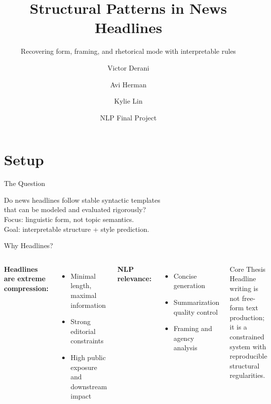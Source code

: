 \documentclass[aspectratio=169, 11pt]{beamer}
\title{Structural Patterns in News Headlines}
\subtitle{Recovering form, framing, and rhetorical mode with interpretable rules}
\author{Victor Derani \and Avi Herman \and Kylie Lin}
\date{NLP Final Project}
\institute{Department of Computer Science}
\begin{document}
\begin{frame}[plain]
  \maketitle
\end{frame}

\section{Setup}

\begin{frame}{The Question}
  \begin{center}
    \Large
    \textcolor{accent}{Do news headlines follow stable syntactic templates}\\[0.5em]
    \textcolor{accentblue}{that can be modeled and evaluated rigorously?}\\[1.5em]
    \normalsize
    \textcolor{textsub}{Focus: linguistic form, not topic semantics.}\\[0.5em]
    \textcolor{textsub}{Goal: interpretable structure + style prediction.}
  \end{center}
\end{frame}

\begin{frame}{Why Headlines?}
  \begin{columns}
    \textbf{Headlines are extreme compression:}
    \begin{itemize}
      \item Minimal length, maximal information
      \item Strong editorial constraints
      \item High public exposure and downstream impact
    \end{itemize}

    \vspace{0.8em}
    \textbf{NLP relevance:}
    \begin{itemize}
      \item Concise generation
      \item Summarization quality control
      \item Framing and agency analysis
    \end{itemize}

    \begin{block}{Core Thesis}
      Headline writing is not free-form text production; it is a constrained system with reproducible structural regularities.
    \end{block}
  \end{columns}
\end{frame}
\end{document}
